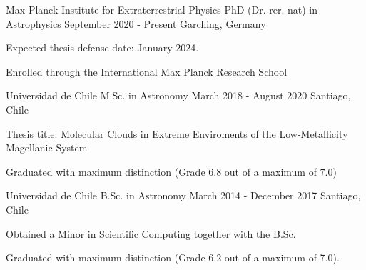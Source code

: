 

\begin{cventries}

 \cventry
    {Max Planck Institute for Extraterrestrial Physics} %
    {PhD (Dr. rer. nat) in Astrophysics} %
    {September 2020 - Present} %
    {Garching, Germany} %
    { \begin{cvitems} %
      \item{Expected thesis defense date: January 2024.}
       \item {Enrolled through the International Max Planck Research School}
      \end{cvitems}
      }


 \cventry
    {Universidad de Chile} %
    {M.Sc. in Astronomy} %
    {March 2018 - August 2020} %
    {Santiago, Chile} %
    {\begin{cvitems} %
    		\item {Thesis title: Molecular Clouds in Extreme Enviroments of the Low-Metallicity Magellanic System}
    		\item {Graduated with maximum distinction (Grade 6.8 out of a maximum of 7.0)}
    	\end{cvitems} }
    

  \cventry
    {Universidad de Chile} %
    {B.Sc. in Astronomy} %
    {March 2014 - December 2017} %
     {Santiago, Chile} %
    {
      \begin{cvitems} %
      \item{Obtained a Minor in Scientific Computing together with the B.Sc.}
       \item {Graduated with maximum distinction (Grade 6.2 out of a maximum of 7.0).}
      \end{cvitems}
    }

\end{cventries}
